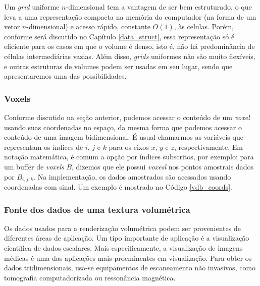 Um \emph{grid} uniforme $n$-dimensional tem a vantagem de ser bem estruturado, o que leva a uma representação compacta na memória do computador (na forma de um vetor $n$-dimensional) e acesso rápido, constante $O(1)$, às celulas. Porém, conforme será discutido no Capítulo \ref{data_struct}, essa representação só é eficiente para os casos em que o volume é denso, isto é, não há predominância de células intermediárias vazias. Além disso, \emph{grids} uniformes não são muito flexíveis, e outras estruturas de volumes podem ser usadas em seu lugar, sendo que apresentaremos uma das possibilidades. \\

\subsubsection{Voxels}

Conforme discutido na seção anterior, podemos acessar o conteúdo de um \emph{voxel} usando suas coordenadas no espaço, da mesma forma que podemos acessar o conteúdo de uma imagem bidimensional. É usual chamarmos as variáveis que representam os índices de $i$, $j$ e $k$ para os eixos $x$, $y$ e $z$, respectivamente. Em notação matemática, é comum a opção por índices subscritos, por exemplo: para um buffer de \emph{voxels}  $B$, dizemos que ele possui \emph{voxesl}  nos pontos amostrais dados por $B_{i,j,k}$. Na implementação, os dados amostrados são acessados usando coordenadas com sinal. Um exemplo é mostrado no Código \ref{vdb_coords}.

\begin{figure}[!htb]

\end{figure}

\subsubsection{Fonte dos dados de uma textura volumétrica}

Os dados usados para a renderização volumétrica podem ser provenientes de diferentes áreas de aplicação. Um tipo importante de aplicação é a visualização científica de dados escalares. Mais especificamente, a visualização de imagens médicas é uma das aplicações mais proeminentes em visualização. Para obter os dados tridimensionais, usa-se equipamentos de escaneamento não invasivos, como  tomografia computadorizada ou ressonância magnética. \\

